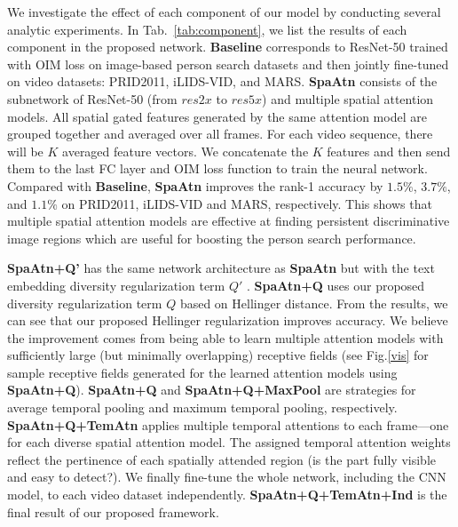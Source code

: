 We investigate the effect of each component of our model by conducting several analytic experiments. 
In Tab.~\ref{tab:component}, we list the results of each component in the proposed network. 
\textbf{Baseline} corresponds to ResNet-50 trained with OIM loss on image-based person search datasets and then jointly fine-tuned on video datasets: PRID2011, iLIDS-VID, and MARS.
\textbf{SpaAtn} consists of the subnetwork of ResNet-50 (from $res2x$ to $res5x$) and multiple spatial attention models. 
All spatial gated features generated by the same attention model are grouped together and averaged over all frames. 
For each video sequence, there will be $K$ averaged feature vectors. 
We concatenate the $K$ features and then send them to the last FC layer and OIM loss function to train the neural network. 
Compared with \textbf{Baseline}, \textbf{SpaAtn} improves the rank-1 accuracy by $1.5 \%$, $3.7 \%$, and $1.1 \%$ on PRID2011, iLIDS-VID and MARS, respectively. 
This shows that multiple spatial attention models are effective at finding persistent discriminative image regions which are useful for boosting the person search performance.

\textbf{SpaAtn+Q'} has the same network architecture as \textbf{SpaAtn} but with the text embedding diversity regularization term $Q'$ \cite{lin2017structured}. 
\textbf{SpaAtn+Q} uses our proposed diversity regularization term $Q$ based on Hellinger distance. From the results, we can see that our proposed Hellinger regularization improves accuracy. 
We believe the improvement comes from being able to learn
multiple attention models with sufficiently large (but minimally overlapping) 
receptive fields (see Fig.\ref{vis} for sample receptive fields generated for the learned attention models using \textbf{SpaAtn+Q}).
\textbf{SpaAtn+Q} and \textbf{SpaAtn+Q+MaxPool} are strategies for average temporal pooling and maximum temporal pooling, respectively.
\textbf{SpaAtn+Q+TemAtn} applies multiple temporal attentions to each frame---one for each diverse spatial attention model. The assigned temporal attention weights reflect the pertinence of each spatially attended region (\eg is the part fully visible and easy to detect?). 
We finally fine-tune the whole network, including the CNN model, to each video dataset independently.
\textbf{SpaAtn+Q+TemAtn+Ind} is the final result of our proposed framework.\\



